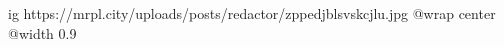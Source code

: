  
 
 
 
 

\ifcmt
  ig https://mrpl.city/uploads/posts/redactor/zppedjblsvskcjlu.jpg
  @wrap center
  @width 0.9
\fi
